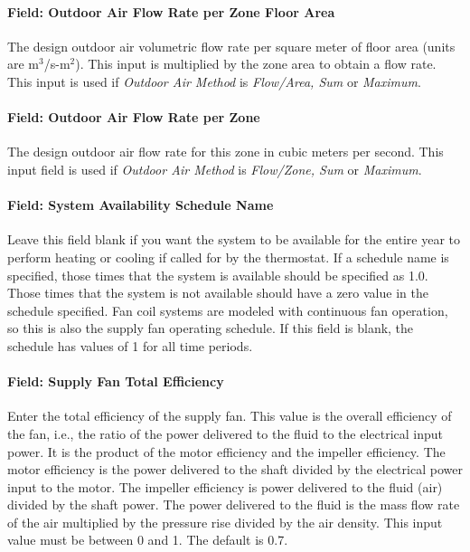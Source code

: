 \paragraph{Field: Outdoor Air Flow Rate per Zone Floor Area}\label{field-outdoor-air-flow-rate-per-zone-floor-area-2}

The design outdoor air volumetric flow rate per square meter of floor area (units are m\(^{3}\)/s-m\(^{2}\)). This input is multiplied by the zone area to obtain a flow rate. This input is used if \emph{Outdoor Air Method} is \emph{Flow/Area, Sum} or \emph{Maximum}.

\paragraph{Field: Outdoor Air Flow Rate per Zone}\label{field-outdoor-air-flow-rate-per-zone-2}

The design outdoor air flow rate for this zone in cubic meters per second. This input field is used if \emph{Outdoor Air Method} is \emph{Flow/Zone, Sum} or \emph{Maximum}.

\paragraph{Field: System Availability Schedule Name}\label{field-system-availability-schedule-name-1}

Leave this field blank if you want the system to be available for the entire year to perform heating or cooling if called for by the thermostat. If a schedule name is specified, those times that the system is available should be specified as 1.0. Those times that the system is not available should have a zero value in the schedule specified. Fan coil systems are modeled with continuous fan operation, so this is also the supply fan operating schedule. If this field is blank, the schedule has values of 1 for all time periods.

\paragraph{Field: Supply Fan Total Efficiency}\label{field-supply-fan-total-efficiency}

Enter the total efficiency of the supply fan. This value is the overall efficiency of the fan, i.e., the ratio of the power delivered to the fluid to the electrical input power. It is the product of the motor efficiency and the impeller efficiency. The motor efficiency is the power delivered to the shaft divided by the electrical power input to the motor. The impeller efficiency is power delivered to the fluid (air) divided by the shaft power. The power delivered to the fluid is the mass flow rate of the air multiplied by the pressure rise divided by the air density. This input value must be between 0 and 1. The default is 0.7.

